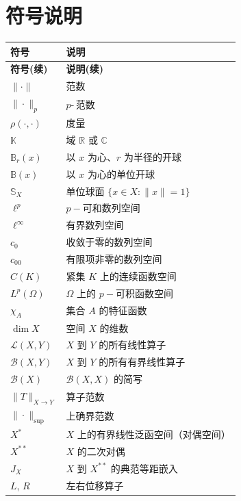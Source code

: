 \chapter*{符号说明}
{\small
\setlength{\tabcolsep}{6pt}
\renewcommand{\arraystretch}{1.2}
\begin{longtable}{p{3.2cm}p{\dimexpr\linewidth-3.4cm-4\tabcolsep\relax}}
    \hline
    \textbf{符号} & \textbf{说明} \\
    \hline
    \endfirsthead
    \hline
    \textbf{符号(续)} & \textbf{说明(续)} \\
    \hline
    \endhead
    \hline
    \endfoot
    $\|\cdot\|$ & 范数 \\
    $\|\cdot\|_p$ & $p$-$\,$范数 \\
    $\rho(\cdot,\cdot)$ & 度量 \\
    $\mathbb{K}$ & 域 $\mathbb{R}$ 或 $\mathbb{C}$ \\
    $\mathbb{B}_r(x)$ & 以 $x$ 为心、$r$ 为半径的开球 \\
    $\mathbb{B}(x)$ & 以 $x$ 为心的单位开球 \\
     $\mathbb{S}_X$ & 单位球面 $\{x\in X:\|x\|=1\}$ \\
    $\ell^p$ & $p-\!\!$可和数列空间 \\
    $\ell^\infty$ & 有界数列空间 \\
    $c_0$ & 收敛于零的数列空间 \\
    $c_{00}$ & 有限项非零的数列空间 \\
    $C(K)$ & 紧集 $K$ 上的连续函数空间 \\
    $L^p(\Omega)$ & $\Omega$ 上的 $p-\!\!$可积函数空间 \\
    $\chi_{A}$ & 集合 $A$ 的特征函数 \\
    $\dim X$ & 空间 $X$ 的维数 \\ 
    $\mathcal{L}(X,Y)$ & $X$ 到 $Y$ 的所有线性算子 \\
    $\mathcal{B}(X,Y)$ & $X$ 到 $Y$ 的所有有界线性算子 \\
    $\mathcal{B}(X)$ & $\mathcal{B}(X,X)$ 的简写 \\
    $\|T\|_{X\to Y}$ & 算子范数 \\
    $\|\cdot\|_{\sup}$ & 上确界范数 \\
    $X^*$ & $X$ 上的有界线性泛函空间（对偶空间） \\
    $X^{**}$ & $X$ 的二次对偶 \\
    $J_X$ & $X$ 到 $X^{**}$ 的典范等距嵌入 \\
    $L$, $R$ & 左右位移算子 \\

\end{longtable}}
